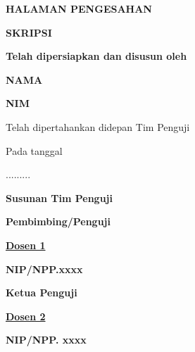  {}

%

\begin{center}
	{\Large \textbf{HALAMAN PENGESAHAN} }
	
	\vspace{\baselineskip}
	
	{\Large \textbf{SKRIPSI} }
	
	\vspace{\baselineskip}
	
	{\Large \textbf{\judulindo} }
	
	\vspace{\baselineskip}
	
	\textbf{Telah dipersiapkan dan disusun oleh}
	
	\vspace{\baselineskip}
    \textbf{NAMA}
	
	\textbf{NIM}
	
	\vspace{\baselineskip}
	
	Telah dipertahankan didepan Tim Penguji
	
	Pada tanggal
	
	.........
	
	\vspace{\baselineskip}
	
	\textbf{Susunan Tim Penguji}
	
	\vspace{1\baselineskip}
	\noindent\hspace*{-1cm}%
	\begin{minipage}{\dimexpr0.6\textwidth+1cm}
		\textbf{Pembimbing/Penguji}
		
		\vspace{3\baselineskip}
		
		{\textbf{\underline{Dosen 1}}}
		
		\textbf{NIP/NPP.xxxx}
	\end{minipage}%
	\begin{minipage}{\dimexpr0.5\textwidth}
		\textbf{Ketua Penguji}
		
		\vspace{3\baselineskip}
		
		{\textbf{\underline{Dosen 2}}}
		
		\textbf{NIP/NPP. xxxx}
	\end{minipage}
	

\end{center}
